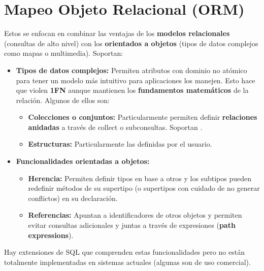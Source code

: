 \section*{Mapeo Objeto Relacional (ORM)}
Estos se enfocan en combinar las ventajas de los \textbf{modelos relacionales} (consultas de alto nivel) con los \textbf{orientados a objetos} (tipos de datos complejos como mapas o multimedia). Soportan:
\begin{itemize}
    \item \textbf{Tipos de datos complejos:} Permiten atributos con dominio no atómico para tener un modelo más intuitivo para aplicaciones los manejen. Esto hace que violen \textbf{1FN} aunque mantienen los \textbf{fundamentos matemáticos} de la relación. Algunos de ellos son:
    \begin{itemize}
        \item \textbf{Colecciones o conjuntos:} Particularmente permiten definir \textbf{relaciones anidadas} a través de collect o subconsultas. Soportan .
        \item \textbf{Estructuras:} Particularmente las definidas por el usuario.
    \end{itemize}
    \item \textbf{Funcionalidades orientadas a objetos:}
    \begin{itemize}
        \item \textbf{Herencia:} Permiten definir tipos en base a otros y los subtipos pueden redefinir métodos de su supertipo (o supertipos con cuidado de no generar conflictos) en su declaración.
        \item \textbf{Referencias:} Apuntan a identificadores de otros objetos y permiten evitar consultas adicionales y juntas a través de expresiones (\textbf{path expressions}).
    \end{itemize}
\end{itemize}
Hay extensiones de SQL que comprenden estas funcionalidades pero no están totalmente implementadas en sistemas actuales (algunas son de uso comercial).